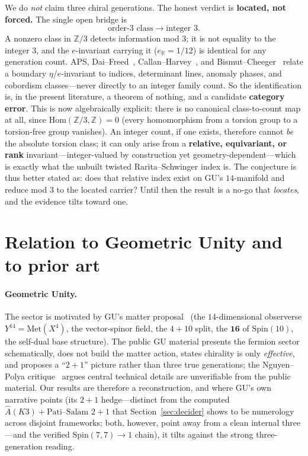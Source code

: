 \documentclass[11pt]{article}
\theoremstyle{definition}
\theoremstyle{remark}
\newcommand{\Z}{\mathbb{Z}}
\newcommand{\R}{\mathbb{R}}
\newcommand{\Spin}{\mathrm{Spin}}
\newcommand{\Hom}{\mathrm{Hom}}
\newcommand{\Ahat}{\hat{A}}
\newcommand{\eR}{e_{\R}}
\begin{document}
We do \emph{not} claim three chiral generations. The honest verdict is \textbf{located, not forced.} The single
open bridge is
\[
\text{order-}3\text{ class} \longrightarrow \text{integer }3.
\]
A nonzero class in $\Z/3$ detects information mod $3$; it is not equality to the integer $3$, and the
$e$-invariant carrying it ($\eR=1/12$) is identical for any generation count. APS, Dai--Freed~\cite{dai1994eta},
Callan--Harvey~\cite{callan1985anomalies}, and Bismut--Cheeger~\cite{bismut1989eta} relate a boundary
$\eta$/$e$-invariant to indices, determinant lines, anomaly phases, and
cobordism classes---never directly to an integer family count. So the identification is, in the present
literature, a theorem of nothing, and a candidate \textbf{category error}. This is now algebraically explicit:
there is no canonical class-to-count map at all, since $\Hom(\Z/3,\Z) = 0$ (every homomorphism from a torsion
group to a torsion-free group vanishes). An integer count, if one exists, therefore cannot \emph{be} the absolute
torsion class; it can only arise from a \textbf{relative, equivariant, or rank} invariant---integer-valued by
construction yet geometry-dependent---which is exactly what the unbuilt twisted Rarita--Schwinger index is. The
conjecture is thus better stated as: does that relative index exist on GU's $14$-manifold and reduce mod $3$ to
the located carrier? Until then the result is a no-go that \emph{locates}, and the evidence tilts toward one.

\section{Relation to Geometric Unity and to prior art}\label{sec:relation}

\paragraph{Geometric Unity.} The sector is motivated by GU's matter proposal~\cite{weinstein2021gu} (the
$14$-dimensional observerse $Y^{14} = \mathrm{Met}(X^4)$, the vector-spinor field, the $4+10$ split, the
$\mathbf{16}$ of $\Spin(10)$, the self-dual base structure). The public GU material presents the fermion sector
schematically, does not build the matter action, states chirality is only \emph{effective}, and proposes a
``$2+1$'' picture rather than three true generations; the Nguyen--Polya critique~\cite{nguyen2021response}
argues central technical details are unverifiable from the public material. Our
results are therefore a reconstruction, and where GU's own narrative points (its $2+1$ hedge---distinct from the
computed $\Ahat(K3)+\text{Pati--Salam}$ $2+1$ that Section~\ref{sec:decider} shows to be numerology across
disjoint frameworks; both, however, point away from a clean internal three---and the verified
$\Spin(7,7)\to 1$ chain), it tilts against the strong three-generation reading.
\end{document}
